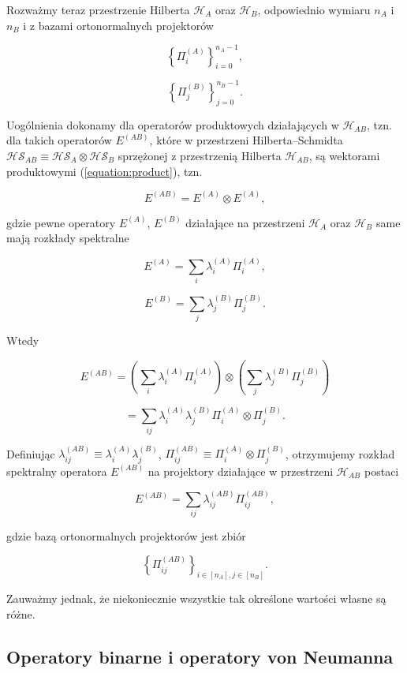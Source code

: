 Rozważmy teraz przestrzenie Hilberta $\mathcal{H}_{A}$ oraz $\mathcal{H}_{B}$, odpowiednio wymiaru $n_{A}$ i $n_{B}$ i z bazami ortonormalnych projektorów

$$
    \left\{\Pi_{i} ^ {(A)}\right\}_{i = 0} ^ {n_{A} - 1},
$$

$$
    \left\{\Pi_{j} ^ {(B)}\right\}_{j = 0} ^ {n_{B} - 1}.
$$

Uogólnienia dokonamy dla operatorów produktowych działających w $\mathcal{H}_{AB}$, tzn. dla takich operatorów $E ^ {(AB)}$, które w przestrzeni Hilberta--Schmidta $\mathcal{HS}_{AB} \equiv \mathcal{HS}_A \otimes \mathcal{HS}_B$ sprzężonej z przestrzenią Hilberta $\mathcal{H}_{AB}$, są wektorami produktowymi (\ref{equation:product}), tzn.

$$
    E ^ {(AB)} = E ^ {(A)} \otimes E ^ {(A)},
$$

gdzie pewne operatory $E ^ {(A)}$, $E ^ {(B)}$ działające na przestrzeni $\mathcal{H}_A$ oraz $\mathcal{H}_B$ same mają rozkłady spektralne

$$
    E ^ {(A)} = \sum\limits_{i} \lambda_{i} ^ {(A)} \Pi_{i} ^ {(A)},
$$

$$
    E ^ {(B)} = \sum\limits_{j} \lambda_{j} ^ {(B)} \Pi_{j} ^ {(B)}.
$$

Wtedy

$$
    E ^ {(AB)} = \left(\sum\limits_{i} \lambda_{i} ^ {(A)} \Pi_{i} ^ {(A)}\right) \otimes \left(\sum\limits_{j} \lambda_{j} ^ {(B)} \Pi_{j} ^ {(B)}\right)
$$

$$
    = \sum\limits_{ij} \lambda_{i} ^ {(A)} \lambda_{j} ^ {(B)} \Pi_{i} ^ {(A)} \otimes \Pi_{j} ^ {(B)}.
$$

Definiując $\lambda_{ij} ^ {(AB)} \equiv \lambda_{i} ^ {(A)} \lambda_{j} ^ {(B)}$, $\Pi_{ij} ^ {(AB)} \equiv \Pi_{i} ^ {(A)} \otimes \Pi_{j} ^ {(B)}$, otrzymujemy rozkład spektralny operatora $E ^ {(AB)}$ na projektory działające w przestrzeni $\mathcal{H}_{AB}$ postaci

$$
    E ^ {(AB)} = \sum\limits_{ij} \lambda_{ij} ^ {(AB)} \Pi_{ij} ^ {(AB)},
$$

gdzie bazą ortonormalnych projektorów jest zbiór

$$
    \left\{\Pi_{ij} ^ {(AB)}\right\}_{i \in [n_{A}], j \in [n_{B}]}.
$$

\begin{remark}
    Zauważmy jednak, że niekoniecznie wszystkie tak określone wartości własne są różne.
\end{remark}

\subsection{Operatory binarne i operatory von Neumanna}

